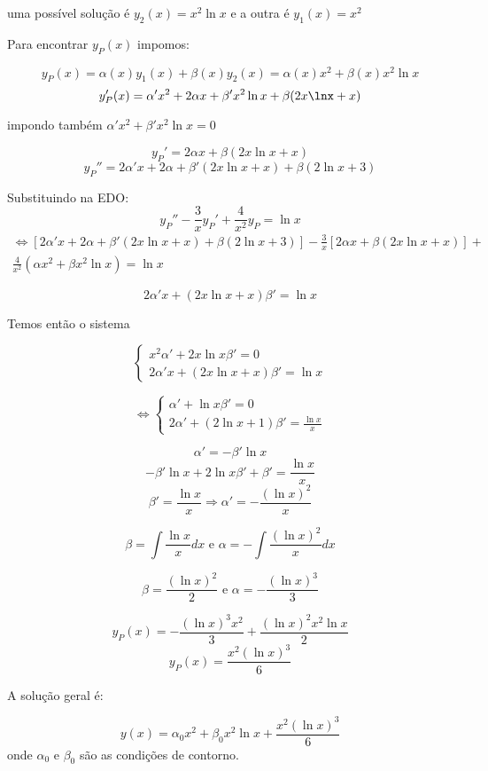  uma possível solução é \( y_2(x) = x^2 \ln x \)   e a outra é \( y_1(x) = x^2 \) 
 
 
 Para encontrar \( y_P(x) \) impomos:
 
 \[ y_P(x) = \alpha (x) y_1(x) + \beta (x) y_2 (x) = \alpha (x) x^2 + \beta (x) x^2 \ln x\]
 \[ y_P'(x) =  \alpha ' x^2 + 2 \alpha  x + \beta ' x^2 \ln x + \beta (2x\lnx + x) \]
 
 
 impondo também \( \alpha ' x^2 + \beta ' x^2 \ln x = 0  \) 
 
 \[ y_P '   =  2 \alpha x + \beta (2x \ln x + x) \]
 \[ y_P'' = 2 \alpha ' x + 2 \alpha + \beta ' (2x \ln x + x ) + \beta (2 \ln x + 3) \]
 
 Substituindo na EDO:
 \[ y_P '' - \frac{3}{x} y_P ' + \frac{4}{x^2} y_P = \ln x \]
 \begin{multline*}
   \Leftrightarrow \left[ 2 \alpha ' x + 2 \alpha  + \beta ' (2x \ln x + x) + \beta (2 \ln x + 3)
   \right] - \frac{3}{x} \left[ 2 \alpha x + \beta \left( 2x \ln x + x \right) \right]+
   \\ \frac{4}{x^2} \left( \alpha x^2 + \beta x^2 \ln x  \right) = \ln x \end{multline*}
 
 \[ 2 \alpha ' x + \left( 2x \ln x + x \right)\beta ' = \ln x \]
 
 
 
 Temos então o sistema
 
 $$\begin{cases}
     x^2 \alpha ' + 2 x \ln x \beta ' = 0 \\
     2 \alpha ' x + \left( 2x \ln x + x \right) \beta ' = \ln x  
   \end{cases}$$
   
   \[ \Leftrightarrow \begin{cases}
          \alpha ' + \ln x \beta ' = 0 \\ 2 \alpha ' + \left( 2 \ln x + 1\right) \beta ' = \frac{\ln x}{x}
        \end{cases} \]
      
      \[ \alpha ' = - \beta ' \ln x   \]
      \[ - \beta ' \ln x + 2\ln x \beta' + \beta ' = \frac{\ln x}{x} \]
      \[ \beta ' = \frac{\ln x }{x} \Rightarrow \alpha ' = - \frac{(\ln x)^2}{x} \]
      
      
      
      \[ \beta = \int \frac{\ln x}{x} dx \text{ e } \alpha = - \int \frac{(\ln x)^2}{x} dx \]
      
      \[ \beta = \frac{(\ln x)^2}{2} \text{ e } \alpha = - \frac{(\ln x )^3}{3} \]
      
      
      \[ y_P(x) = - \frac{(\ln x )^3 x^2}{3} + \frac{(\ln x)^2 x^2 \ln x}{2}\]
      \[ y_P(x) = \frac{x^2 (\ln x)^3}{6} \]
      
   
      
      A solução geral é:

      \[ y(x) =  \alpha _0 x^2 + \beta _0 x^2 \ln x + \frac{x^2 (\ln x)^3 }{6}\]
      onde \( \alpha_0 \)   e \( \beta_0 \) são as condições de contorno.





